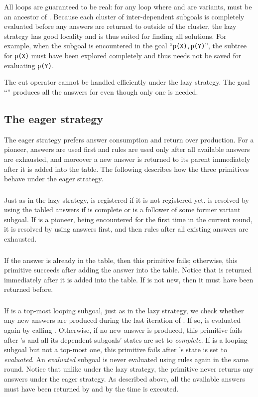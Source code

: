\documentclass{tlp}
\begin{document}
All loops are guaranteed to be real: for any loop  where  and  are variants,  must be an ancestor of . Because each cluster of inter-dependent subgoals is completely evaluated before any answers are returned to outside of the cluster, the lazy strategy has good locality and is thus suited for finding all solutions. For example, when the subgoal  is encountered in the goal ``{\tt p(X),p(Y)}'', the subtree for {\tt p(X)} must have been explored completely and thus needs not be saved for evaluating {\tt p(Y)}. 

The cut operator cannot be handled efficiently under the lazy strategy. The goal ``'' produces all the answers for  even though only one is needed. 

\subsection{\label{subsection:eager}The eager strategy}
The eager strategy prefers answer consumption and return over production. For a pioneer, answers are used first and rules are used only after all available answers are exhausted, and moreover a new answer is returned to its parent immediately after it is added into the table. The following describes how the three primitives behave under the eager strategy.

\subsubsection{}
Just as in the lazy strategy,  is registered if it is not registered yet.  is resolved by using the tabled answers if  is complete or  is a follower of some former variant subgoal. If  is a pioneer, being encountered for the first time in the current round, it is resolved by using answers first, and then rules after all existing answers are exhausted.

\subsubsection{}
If the answer  is already in the table, then this primitive fails; otherwise, this primitive succeeds after adding the answer  into the table. Notice that  is returned immediately after it is added into the table. If  is not new, then it must have been returned before.

\subsubsection{}
If  is a top-most looping subgoal, just as in the lazy strategy, we check whether any new answers are produced during the last iteration of . If so,  is evaluated again by calling . Otherwise, if no new answer is produced, this primitive fails after 's and all its dependent subgoals' states are set to {\it complete}. If  is a looping subgoal but not a top-most one, this primitive fails after 's state is set to {\it evaluated}. An {\it evaluated} subgoal is never evaluated using rules again in the same round. Notice that unlike under the lazy strategy, the primitive  never returns any answers under the eager strategy. As described above, all the available answers must have been returned by  and  by the time  is executed.
\end{document}
